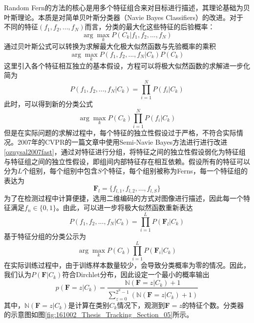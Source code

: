 Random Fern的方法的核心是用多个特征组合来对目标进行描述，其理论基础为贝叶斯理论。本质是对简单贝叶斯分类器（Navie Bayes Classifiers）的改进。对于不同的特征$(f_1, f_2, ..., f_N)$而言，分类的最大化这些特征的后验概率：
\begin{equation}
\arg \max_{k}P(C_k|f_1, f_2, ..., f_N)
\end{equation}
通过贝叶斯公式可以转换为求解最大化极大似然函数与先验概率的乘积
\begin{equation}
\arg \max_{k}P(f_1, f_2, ..., f_N|C_k)P(C_k)
\end{equation}
这里引入各个特征相互独立的基本假设，方程可以将极大似然函数的求解进一步化简为
\begin{equation}
P(f_1, f_2, ..., f_N|C_k)=\prod\limits_{i=1}^{N}P(f_i|C_k)
\end{equation}
此时，可以得到新的分类公式
\begin{equation}
\arg\max_kP(C_k)\prod\limits_{i=1}^{N}P(f_i|C_k)
\end{equation}
但是在实际问题的求解过程中，每个特征的独立性假设过于严格，不符合实际情况。2007年的CVPR的一篇文章中使用Semi-Navie Bayes方法进行进行改进\ref{ozuysal2007fast}，通过对特征进行分组，将特征之间的独立性假设弱化为特征组与特征组之间的独立性假设，即组间内部特征存在相互依赖。假设所有的特征可以分为$L$个组别，每个组别中包含$S$个特征，每个组别被称为Ferns，每一个特征组的表达为
\begin{equation}
\mathbf{F}_l=\{f_{l,1}, f_{l,2},..., f_{l,S}\}
\end{equation}
为了在检测过程中计算便捷，选用二维编码的方式对图像进行描述，因此每一个特征满足$f_n\in\{{0,1}\}$。由此，可以进一步将极大似然函数重新表达
\begin{equation}
P(f_1, f_2, ..., f_N|C_k)=\prod\limits_{i=1}^{L}P(\mathbf{F}_l|C_k)
\end{equation}
基于特征分组的分类公示为
\begin{equation}
\arg\max_kP(C_k)\prod\limits_{i=1}^{L}P(\mathbf{F}_i|C_k)
\end{equation}
在实际训练过程中，由于训练样本数量较少，会导致分类概率为零的情况。因此，我们认为$P(\mathbf{F}|C_k)$符合Dirchlet分布，因此设定一个最小的概率输出
\begin{equation}
p(\mathbf{F}=z|C_k)=\frac{\mathbb{N}(\mathbf{F}=z|C_k)+1}{\sum_{z=0}^{2^S-1}(\mathbb{N}(\mathbf{F}=z|C_k)+1)}
\end{equation}
其中，$\mathbb{N}(\mathbf{F}=z|C_k)$是计算在类别$C_k$情况下，观测到$\mathbf{F}=z$的特征个数。分类器的示意图如图\ref{fig:161002_Thesis_Tracking_Section_05}所示。
